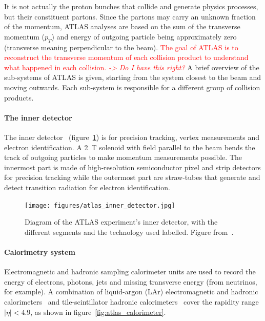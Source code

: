 It is not actually the proton bunches that collide and generate physics processes, but their constituent partons. Since the partons may carry an unknown fraction of the momentum, ATLAS analyses are based on the sum of the transverse momentum ($p_T$) and energy of outgoing particle being approximately zero (transverse meaning perpendicular to the beam). \textcolor{red}{The goal of ATLAS is to reconstruct the transverse momentum of each collision product to understand what happened in each collision. \textit{-> Do I have this right?}} A brief overview of the sub-systems of ATLAS is given, starting from the system closest to the beam and moving outwards. Each sub-system is responsible for a different group of collision products.

\paragraph*{The inner detector} \hfill \break
The inner detector~\cite{atlas_inner_detector_tdr_1, atlas_inner_detector_tdr_2} (figure~\ref{fig:atlas_inner_detector}) is for precision tracking, vertex measurements and electron identification. A \SI{2}{\tesla} solenoid with field parallel to the beam bends the track of outgoing particles to make momentum measurements possible. The innermost part is made of high-resolution semiconductor pixel and strip detectors for precision tracking while the outermost part are straw-tubes that generate and detect transition radiation for electron identification.

\begin{figure}
    \centering
    \texttt{[image: figures/atlas\_inner\_detector.jpg]}
    \caption{Diagram of the ATLAS experiment's inner detector, with the different segments and the technology used labelled. Figure from~\cite{collaboration_atlas_2008}.}
    \label{fig:atlas_inner_detector}
\end{figure}

\paragraph*{Calorimetry system} \hfill \break
Electromagnetic and hadronic sampling calorimeter units are used to record the energy of electrons, photons, jets and missing transverse energy (from neutrinos, for example). A combination of liquid-argon (LAr) electromagnetic and hadronic calorimeters~\cite{atlas_lar_cal_tdr} and tile-scintillator hadronic calorimeters~\cite{atlas_tile_cal_tdr} cover the rapidity range $|\eta| < 4.9$, as shown in figure~\ref{fig:atlas_calorimeter}.

